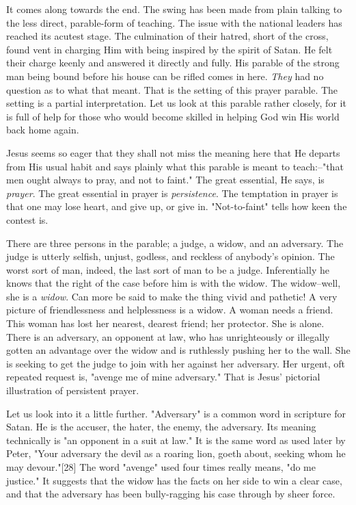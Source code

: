 It comes along towards the end. The swing has been made from plain talking
to the less direct, parable-form of teaching. The issue with the national
leaders has reached its acutest stage. The culmination of their hatred,
short of the cross, found vent in charging Him with being inspired by the
spirit of Satan. He felt their charge keenly and answered it directly and
fully. His parable of the strong man being bound before his house can be
rifled comes in here. \textit{They} had no question as to what that meant. That
is the setting of this prayer parable. The setting is a partial
interpretation. Let us look at this parable rather closely, for it is full
of help for those who would become skilled in helping God win His world
back home again.

Jesus seems so eager that they shall not miss the meaning here that He
departs from His usual habit and says plainly what this parable is meant
to teach:--"that men ought always to pray, and not to faint." The great
essential, He says, is \textit{prayer}. The great essential in prayer is
\textit{persistence}. The temptation in prayer is that one may lose heart, and
give up, or give in. "Not-to-faint" tells how keen the contest is.

There are three persons in the parable; a judge, a widow, and an
adversary. The judge is utterly selfish, unjust, godless, and reckless of
anybody's opinion. The worst sort of man, indeed, the last sort of man to
be a judge. Inferentially he knows that the right of the case before him
is with the widow. The widow--well, she is a \textit{widow}. Can more be said to
make the thing vivid and pathetic! A very picture of friendlessness and
helplessness is a widow. A woman needs a friend. This woman has lost her
nearest, dearest friend; her protector. She is alone. There is an
adversary, an opponent at law, who has unrighteously or illegally gotten
an advantage over the widow and is ruthlessly pushing her to the wall. She
is seeking to get the judge to join with her against her adversary. Her
urgent, oft repeated request is, "avenge me of mine adversary." That is
Jesus' pictorial illustration of persistent prayer.

Let us look into it a little further. "Adversary" is a common word in
scripture for Satan. He is the accuser, the hater, the enemy, the
adversary. Its meaning technically is "an opponent in a suit at law." It
is the same word as used later by Peter, "Your adversary the devil as a
roaring lion, goeth about, seeking whom he may devour."[28] The word
"avenge" used four times really means, "do me justice." It suggests that
the widow has the facts on her side to win a clear case, and that the
adversary has been bully-ragging his case through by sheer force.

